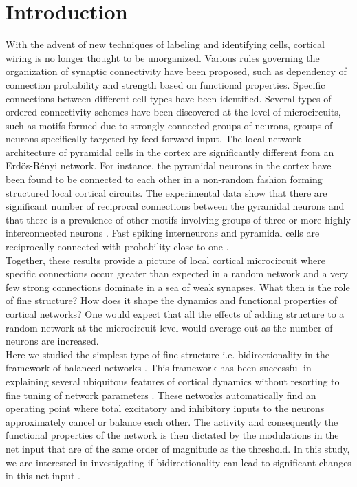 \section{Introduction}
With the advent of new techniques of labeling and identifying cells, cortical wiring is no longer thought to be unorganized. Various rules governing the organization of synaptic connectivity have been proposed, such as dependency of connection probability and strength based on functional properties.  Specific connections between different cell types have been identified. Several types of ordered connectivity schemes have been discovered at the level of microcircuits, such as motifs formed due to strongly connected groups of neurons, groups of neurons specifically targeted by feed forward input. The local network architecture of pyramidal cells in the cortex are significantly different from an Erdös-Rényi network. For instance, the pyramidal neurons in the cortex have been found to be connected to each other in a non-random fashion forming structured local cortical circuits. The experimental data show that there are significant number of reciprocal connections between the pyramidal neurons and that there is a prevalence of other motifs involving groups of three or more highly interconnected neurons \cite{markram1997,thomson2002, Song2005, Perin2011}. Fast spiking interneurons and pyramidal cells are reciprocally connected with probability close to one \cite{Yoshimura2005}.\\
Together, these results provide a picture of local cortical microcircuit where specific connections occur greater than expected in a random network and a very few strong connections dominate in a sea of weak synapses. What then is the role of fine structure? How does it shape the dynamics and functional properties of cortical networks? One would expect that all the effects of adding structure to a random network at the microcircuit level would average out as the number of neurons are increased.  \\

Here we studied the simplest type of fine structure i.e. bidirectionality in the framework of balanced networks \cite{carl1996, carl1998, carl2004}. This framework has been successful in explaining several ubiquitous features of cortical dynamics without resorting to fine tuning of network parameters \cite{softky1993, Holt1996, roxin2011}. These networks automatically find an operating point where total excitatory and inhibitory inputs to the neurons approximately cancel or balance each other. The activity and consequently the functional properties of the network is then dictated by the modulations in the net input that are of the same order of magnitude as the threshold. In this study, we are interested in investigating if bidirectionality can lead to significant changes in this net input . \\
	

